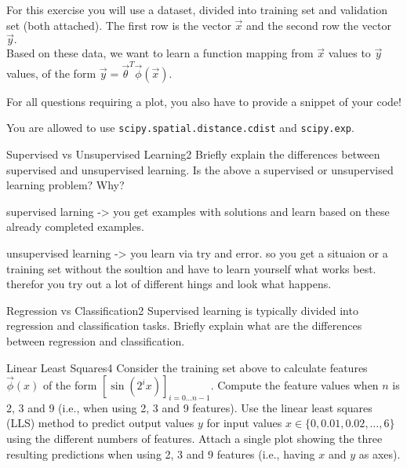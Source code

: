 For this exercise you will use a dataset, divided into training set and validation set (both attached). The first row is the vector $\vec x$ and the second row the vector $\vec y.$
\\
Based on these data, we want to learn a function mapping from $\vec x$ values to $\vec y$ values, of the form $\vec y=\vec{\theta}^{T}\vec{\phi}(\vec x)$.

For all questions requiring a plot, you also have to provide a snippet of your code!

You are allowed to use \texttt{scipy.spatial.distance.cdist} and \texttt{scipy.exp}.

\begin{questions}
	
	
	\begin{question}{Supervised vs Unsupervised Learning}{2}
		Briefly explain the differences between supervised and unsupervised learning. 
		Is the above a supervised or unsupervised learning problem? Why?

\begin{answer}
supervised larning -> you get examples with solutions and learn based on these already completed examples.

unsupervised learning -> you learn via try and error. so you get a situaion or a training set without the soultion and have to learn yourself what works best. therefor you try out a lot of different hings and look what happens.



\end{answer}
	\end{question}
	
	
	
	\begin{question}{Regression vs Classification}{2}
		Supervised learning is typically divided into regression and classification tasks. 
		Briefly explain what are the differences between regression and classification.
		
\begin{answer}\end{answer}
	\end{question}
	
	
	
	\begin{question}{Linear Least Squares}{4}
		Consider the training set above to calculate features $\vec{\phi}(x)$ of the form $[\sin(2^{i}x)]_{i = 0 \ldots n-1}$. 
		Compute the feature values when $n$ is 2, 3 and 9 (i.e., when using 2, 3 and 9 features). 
		Use the linear least squares (LLS) method to predict output values $y$ for input values $x\in\{0, 0.01, 0.02, \ldots, 6\}$ using the different numbers of features. 
		Attach a single plot showing the three resulting predictions when using 2, 3 and 9 features (i.e., having $x$ and $y$ as axes).
		

\end{question}
\end{questions}
